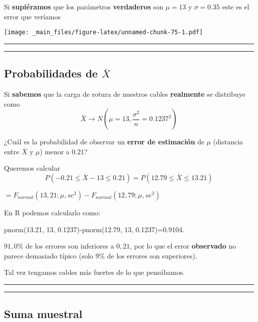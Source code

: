\documentclass[
]{book}
\begin{document}
Si \textbf{supiéramos} que los parámetros \textbf{verdaderos} son \(\mu=13\) y \(\sigma=0.35\) este es el error que veríamos

\texttt{[image: \_main\_files/figure-latex/unnamed-chunk-75-1.pdf]}

\begin{center}\rule{0.5\linewidth}{0.5pt}\end{center}

\begin{center}\rule{0.5\linewidth}{0.5pt}\end{center}

\hypertarget{probabilidades-de-barx}{%
\subsection{\texorpdfstring{Probabilidades de \(\bar{X}\)}{Probabilidades de \textbackslash bar\{X\}}}\label{probabilidades-de-barx}}

Si \textbf{sabemos} que la carga de rotura de nuestros cables \textbf{realmente} se distribuye como \[\bar{X} \rightarrow N(\mu=13, \frac{\sigma^2}{ n}=0.1237^2)\]

¿Cuál es la probabilidad de observar un \textbf{error de estimación} de \(\mu\) (distancia entre \(\bar{X}\) y \(\mu\)) menor a \(0.21\)?

Queremos calcular \[P(-0.21 \leq \bar{X} - 13\leq 0.21)=P(12.79 \leq \bar{X} \leq 13.21)\]

\(=F_{normal}(13,21; \mu, se^2)-F_{normal}(12,79; \mu, se^2)\)

En R podemos calcularlo como:

pnorm(13.21, 13, 0.1237)-pnorm(12.79, 13, 0.1237)=0.9104.

\(91,0\%\) de los errores son inferiores a \(0,21\), por lo que el error \textbf{observado} no parece demasiado típico (solo \(9\%\) de los errores son superiores).

Tal vez tengamos cables más fuertes de lo que pensábamos.

\begin{center}\rule{0.5\linewidth}{0.5pt}\end{center}

\begin{center}\rule{0.5\linewidth}{0.5pt}\end{center}

\hypertarget{suma-muestral}{%
\subsection{Suma muestral}\label{suma-muestral}}
\end{document}
